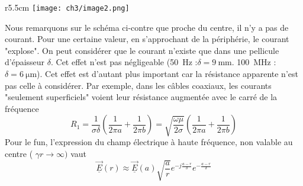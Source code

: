 \newpage
	\begin{wrapfigure}[10]{r}{5.5cm}
	\texttt{[image: ch3/image2.png]}
	\end{wrapfigure}
Nous remarquons sur le schéma ci-contre que proche du centre, il n'y a pas de courant. Pour une 
certaine valeur, en s'approchant de la périphérie, le courant "explose". On peut considérer 
que le courant n'existe que dans une pellicule d'épaisseur $\delta$. Cet effet n'est pas 
négligeable (\SI{50}{\hertz} :$\delta = \SI{9}{\milli\meter}$. \SI{100}{\mega\hertz} : $\delta = \SI{6}{\micro\meter}$). Cet effet est d'autant plus 
important car la résistance apparente n'est pas celle à considérer. Par exemple, dans les 
câbles coaxiaux, les courants "seulement superficiels" voient leur résistance augmentée avec le 
carré de la fréquence
\begin{equation}
R_1 = \dfrac{1}{\sigma\delta}\left(\dfrac{1}{2\pi a}+\dfrac{1}{2\pi b}\right)=
\sqrt{\dfrac{\omega\mu}{2\sigma}}\left(\dfrac{1}{2\pi a}+\dfrac{1}{2\pi b}\right)
\end{equation}
Pour le fun, l'expression du champ électrique à haute fréquence, non valable au centre (
$\gamma r \rightarrow \infty)$ vaut 
\begin{equation}
\underline{\vec{E}}(r) \approx \vec{\underline{E}}(a)\sqrt{\dfrac{a}{r}}e^{-j\frac{a-r}{\delta}}
e^{-\frac{a-r}{\delta}}
\end{equation}
	
	
	
	
	
	
	
	
	
	
	
	
	
	
	
	
	